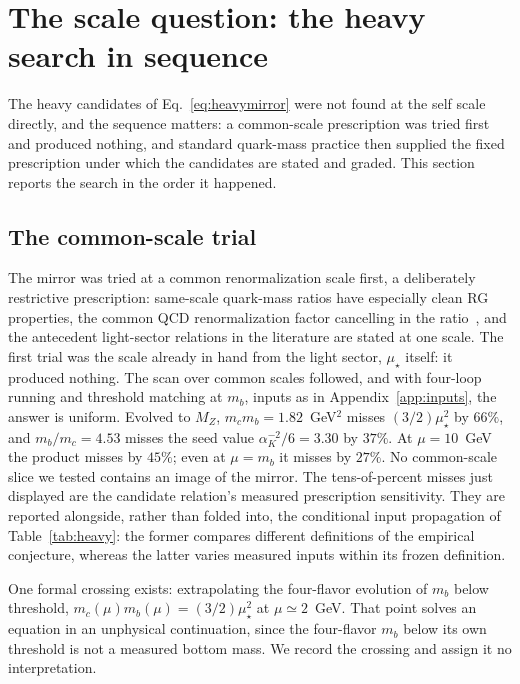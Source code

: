 \documentclass[aps,twocolumn,superscriptaddress,nofootinbib,floatfix]{revtex4-2}
\newcommand{\mstar}{\mu_\star}
\newcommand{\alphaK}{\alpha_K}
\begin{document}
\section{The scale question: the heavy search in sequence}
\label{sec:heavy}

The heavy candidates of Eq.~\eqref{eq:heavymirror} were not found at the self scale directly, and the sequence matters: a common-scale prescription was tried first and produced nothing, and standard quark-mass practice then supplied the fixed prescription under which the candidates are stated and graded. This section reports the search in the order it happened.

\subsection{The common-scale trial}

The mirror was tried at a common renormalization scale first, a deliberately restrictive prescription: same-scale quark-mass ratios have especially clean RG properties, the common QCD renormalization factor cancelling in the ratio~\cite{GasserLeutwyler1982,PDG2026}, and the antecedent light-sector relations in the literature are stated at one scale. The first trial was the scale already in hand from the light sector, $\mstar$ itself: it produced nothing. The scan over common scales followed, and with four-loop running and threshold matching at $m_b$, inputs as in Appendix~\ref{app:inputs}, the answer is uniform. Evolved to $M_Z$, $m_cm_b=1.82$~GeV$^2$ misses $(3/2)\mstar^2$ by $66\%$, and $m_b/m_c=4.53$ misses the seed value $\alphaK^{-2}/6=3.30$ by $37\%$. At $\mu=10$~GeV the product misses by $45\%$; even at $\mu=m_b$ it misses by $27\%$. No common-scale slice we tested contains an image of the mirror. The tens-of-percent misses just displayed are the candidate relation's measured prescription sensitivity. They are reported alongside, rather than folded into, the conditional input propagation of Table~\ref{tab:heavy}: the former compares different definitions of the empirical conjecture, whereas the latter varies measured inputs within its frozen definition.

One formal crossing exists: extrapolating the four-flavor evolution of $m_b$ below threshold, $m_c(\mu)m_b(\mu)=(3/2)\mstar^2$ at $\mu\simeq2$~GeV. That point solves an equation in an unphysical continuation, since the four-flavor $m_b$ below its own threshold is not a measured bottom mass. We record the crossing and assign it no interpretation.
\end{document}
